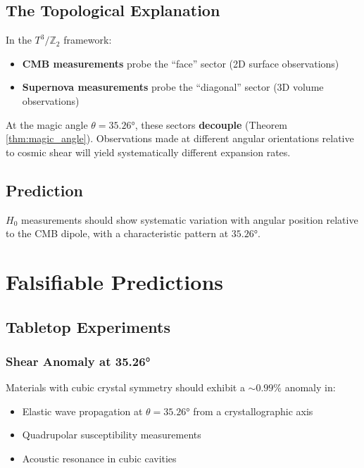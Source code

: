 \documentclass[12pt,a4paper]{article}
\newcommand{\Ztwo}{\mathbb{Z}_2}
\newcommand{\Tthree}{T^3}
\begin{document}
\subsection{The Topological Explanation}

In the $\Tthree/\Ztwo$ framework:
\begin{itemize}
    \item \textbf{CMB measurements} probe the ``face'' sector (2D surface observations)
    \item \textbf{Supernova measurements} probe the ``diagonal'' sector (3D volume observations)
\end{itemize}

At the magic angle $\theta = 35.26°$, these sectors \textbf{decouple} (Theorem \ref{thm:magic_angle}). Observations made at different angular orientations relative to cosmic shear will yield systematically different expansion rates.

\subsection{Prediction}

$H_0$ measurements should show systematic variation with angular position relative to the CMB dipole, with a characteristic pattern at $35.26°$.

\section{Falsifiable Predictions}
\label{sec:predictions}

\subsection{Tabletop Experiments}

\subsubsection{Shear Anomaly at 35.26°}

Materials with cubic crystal symmetry should exhibit a $\sim 0.99\%$ anomaly in:
\begin{itemize}
    \item Elastic wave propagation at $\theta = 35.26°$ from a crystallographic axis
    \item Quadrupolar susceptibility measurements
    \item Acoustic resonance in cubic cavities
\end{itemize}
\end{document}
